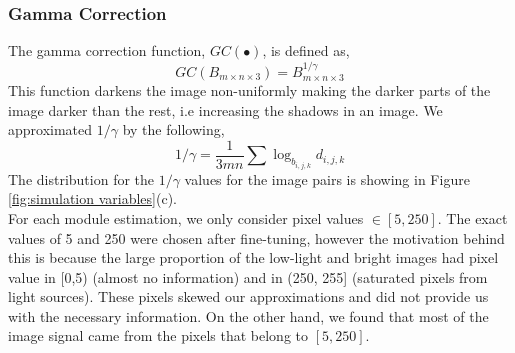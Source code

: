 \documentclass{article}
\begin{document}
\subsubsection{Gamma Correction}
The gamma correction function, $GC(\bullet)$, is defined as, 
$$GC(B_{m\times n\times 3}) = B_{m\times n\times 3}^{1/\gamma}$$
This function darkens the image non-uniformly making the darker parts of the image darker than the rest, i.e increasing the shadows in an image. We approximated $1/\gamma$ by the following, 
$$1/\gamma = \frac{1}{3mn}\sum{\log_{b_{i, j, k}}d_{i, j, k}}$$
The distribution for the $1/\gamma$ values for the image pairs is showing in Figure \ref{fig:simulation variables}(c). \\

For each module estimation, we only consider pixel values $\in [5, 250]$. The exact values of 5 and 250 were chosen after fine-tuning, however the motivation behind this is because the large proportion of the low-light and bright images had pixel value in [0,5) (almost no information) and in (250, 255] (saturated pixels from light sources). These pixels skewed our approximations and did not provide us with the necessary information. On the other hand, we found that most of the image signal came from the pixels that belong to $[5, 250]$. 
\end{document}
